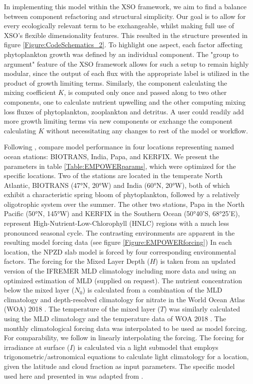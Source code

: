 \documentclass[journal abbreviation, manuscript]{copernicus}
\begin{document}
In implementing this model within the XSO framework, we aim to find a balance between component refactoring and structural simplicity. Our goal is to allow for every ecologically relevant term to be exchangeable, whilst making full use of XSO's flexible dimensionality features. This resulted in the structure presented in figure \ref{Figure:CodeSchematics_2}.
To highlight one aspect, each factor affecting phytoplankton growth was defined by an individual component. The "group to argument" feature of the XSO framework allows for such a setup to remain highly modular, since the output of each flux with the appropriate label is utilized in the product of growth limiting terms. 
Similarly, the component calculating the mixing coefficient $K$, is computed only once and passed along to two other components, one to calculate nutrient upwelling and the other computing mixing loss fluxes of phytoplankton, zooplankton and detritus. A user could readily add more growth limiting terms via new components or exchange the component calculating $K$ without necessitating any changes to rest of the model or workflow.


Following \citet{Anderson2015c}, compare model performance in four locations representing named ocean stations: BIOTRANS, India, Papa, and KERFIX. We present the parameters in table  \ref{Table:EMPOWERparams}, which were optimized for the specific locations. Two of the stations are located in the temperate North Atlantic, BIOTRANS (47°N, 20°W) and India (60°N, 20°W), both of which exhibit a characteristic spring bloom of phytoplankton, followed by a relatively oligotrophic system over the summer. The other two stations, Papa in the North Pacific (50°N, 145°W) and KERFIX in the Southern Ocean (50°40'S, 68°25'E), represent High-Nutrient-Low-Chlorophyll (HNLC) regions with a much less pronounced seasonal cycle. The contrasting environments are apparent in the resulting model forcing data (see figure \ref{Figure:EMPOWERforcing})
In each location, the NPZD slab model is forced by four corresponding environmental factors. 
The forcing for the Mixed Layer Depth ($H$) is taken from an updated version of the IFREMER MLD climatology  \citep{DeBoyerMontegut2004} including more data and using an optimized estimation of MLD (supplied on request).
The nutrient concentration below the mixed layer ($N_0$) is calculated from a combination of the MLD climatology and depth-resolved climatology for nitrate in the World Ocean Atlas (WOA) 2018 \citep{Garcia2019WORLDSilicate}. The temperature of the mixed layer ($T$) was similarly calculated using the MLD climatology and the temperature data of WOA 2018 \citep{Locarnini2019WorldTemperature}. The monthly climatological forcing data was interpolated to be used as model forcing. For comparability, we follow \citet{Anderson2015c} in linearly interpolating the forcing.
The forcing for irradiance at surface ($I$) is calculated via a light submodel that employs trigonometric/astronomical equations to calculate light climatology for a location, given the latitude and cloud fraction as input parameters. The specific model used here and presented in \citet{Anderson2015c} was adapted from \citet{Shine1984ParametrizationAlbedo}.
\end{document}

